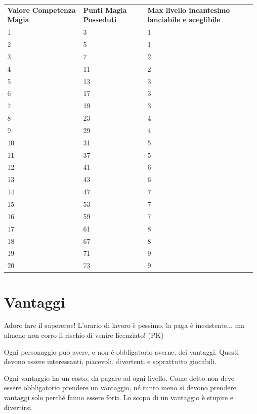 \documentclass[a4paper,11pt,twoside,openany]{book}
\begin{document}
\begin{tabularx}{0.95\textwidth}{XXX}
	\toprule
	\textbf{Valore Competenza Magia} & \textbf{Punti Magia Posseduti} & \textbf{Max livello incantesimo lanciabile e sceglibile} \\
	1  & 3& 1\\
	2  & 5& 1\\
	3  & 7& 2\\
	4  & 11    & 2\\
	5  & 13    & 3\\
	6  & 17    & 3\\
	7  & 19    & 3\\
	8  & 23    & 4\\
	9  & 29    & 4\\
	10 & 31    & 5\\
	11 & 37    & 5\\
	12 & 41    & 6\\
	13 & 43    & 6\\
	14 & 47    & 7\\
	15 & 53    & 7\\
	16 & 59    & 7\\
	17 & 61    & 8\\
	18 & 67    & 8\\
	19 & 71    & 9\\
	20 & 73    & 9\\
\end{tabularx}

\pagebreak

\section{Vantaggi}

\label{vantaggi}
\begin{tcolorbox}[enhanced,arc=5pt,boxrule=0.3pt]{Adoro fare il supereroe! L'orario di lavoro è pessimo, la paga è inesistente... ma almeno non corro il rischio di venire licenziato! (PK)
	}\end{tcolorbox}\medskip

\bigskip

Ogni personaggio può avere, e non è obbligatorio averne, dei vantaggi. Questi devono essere interessanti, piacevoli, divertenti e soprattutto giocabili.

Ogni vantaggio ha un costo, da pagare ad ogni livello. Come detto non deve essere obbligatorio prendere un vantaggio, né tanto meno si devono prendere vantaggi solo perché fanno essere forti. Lo scopo di un vantaggio è stupire e divertirsi.
\end{document}
